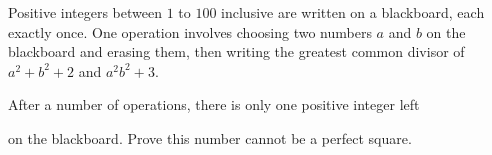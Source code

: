 Positive integers between $1$ to $100$ inclusive are written on a blackboard, each exactly once. One operation involves choosing two numbers $a$ and $b$ on the blackboard and erasing them, then writing the greatest common divisor of $a^2+b^2+2$ and $a^2b^2+3$.

 After a number of operations, there is only one positive integer left 

on the blackboard. Prove this number cannot be a perfect square.